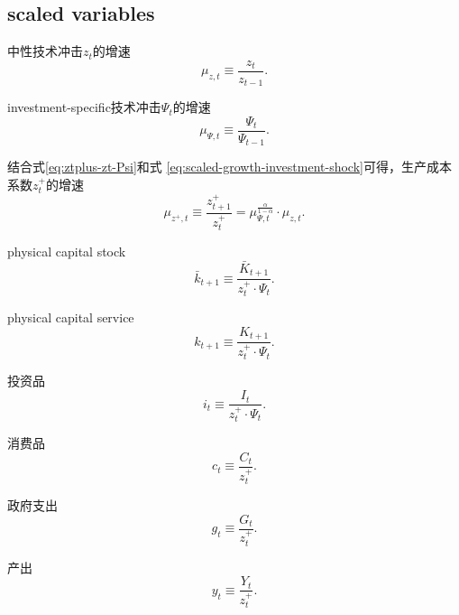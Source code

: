 \begin{subappendices}
\section{scaled variables}
\label{scaled-variables}
中性技术冲击$z_t$的增速
\begin{equation}
  \label{eq:scaled-growth-neutral-shock}
  \mu_{z,t} \equiv \frac{z_t}{z_{t-1}}.
\end{equation}

investment-specific技术冲击$\Psi_t$的增速
\begin{equation}
  \label{eq:scaled-growth-investment-shock}
  \mu_{\Psi,t} \equiv \frac{\Psi_t}{\Psi_{t-1}}.
\end{equation}

结合式\eqref{eq:ztplus-zt-Psi}和式  \eqref{eq:scaled-growth-investment-shock}可得，生产成本系数$z_t^+$的增速
\begin{equation}
  \label{eq:scaled-growth-fixed-cost-shock}
  \mu_{z^+,t} \equiv \frac{z^+_{t+1}}{z^+_{t}} = \mu_{\Psi,t}^{\frac{\alpha}{1-\alpha}} \cdot \mu_{z,t}.
\end{equation}

physical capital stock
\begin{equation}
  \label{eq:scaled-physical-capital}
  \bar{k}_{t+1} \equiv \frac{\bar{K}_{t+1}}{z_t^{+} \cdot \Psi_{t}}.
\end{equation}

physical capital service
\begin{equation}
  \label{eq:scaled-physical-capital-service}
  k_{t+1} \equiv \frac{K_{t+1}}{z_{t}^+ \cdot \Psi_{t}}.
\end{equation}

投资品
\begin{equation}
  \label{eq:scaled-investment-goods}
  i_t \equiv \frac{I_t}{z_t^+ \cdot \Psi_{t}}.
\end{equation}

消费品
\begin{equation}
  \label{eq:scaled-consumption-goods}
  c_t \equiv \frac{C_t}{z_t^+}.
\end{equation}

政府支出
\begin{equation}
  \label{eq:scaled-government-consumption}
  g_t \equiv \frac{G_t}{z_t^+}.
\end{equation}

产出
\begin{equation}
  \label{eq:scaled-product}
  y_t \equiv \frac{Y_t}{z_t^+}.
\end{equation}


\end{subappendices}
